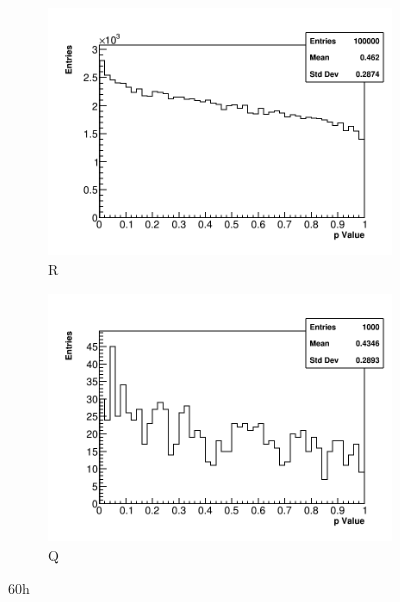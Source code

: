 \begin{figure}[]
    \begin{subfigure}[t]{0.45\textwidth}
        \centering
        \includegraphics[width=\textwidth]{PValues_RMethod}
        \caption{R}
    \end{subfigure}
    \hspace{1mm}
    \begin{subfigure}[t]{0.45\textwidth}
        \centering
        \includegraphics[width=\textwidth]{PValues_QMethod}
        \caption{Q}
    \end{subfigure}
\caption[]{60h}
\label{fig:}
\end{figure}


